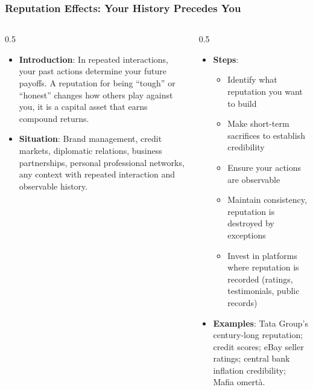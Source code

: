 \begin{frame}[fragile]\frametitle{Reputation Effects: Your History Precedes You}
\begin{columns}
    \begin{column}[T]{0.5\linewidth}
      \begin{itemize}
        \item \textbf{Introduction}: In repeated interactions, your past actions determine your future payoffs. A reputation for being ``tough'' or ``honest'' changes how others play against you, it is a capital asset that earns compound returns.
        \item \textbf{Situation}: Brand management, credit markets, diplomatic relations, business partnerships, personal professional networks, any context with repeated interaction and observable history.
      \end{itemize}
    \end{column}
    \begin{column}[T]{0.5\linewidth}
      \begin{itemize}
        \item \textbf{Steps}:
        \begin{itemize}
          \item Identify what reputation you want to build
          \item Make short-term sacrifices to establish credibility
          \item Ensure your actions are observable
          \item Maintain consistency, reputation is destroyed by exceptions
          \item Invest in platforms where reputation is recorded (ratings, testimonials, public records)
        \end{itemize}\item \textbf{Examples}: Tata Group's century-long reputation; credit scores; eBay seller ratings; central bank inflation credibility; Mafia omertà.
      \end{itemize}
    \end{column}
  \end{columns}
\end{frame}

